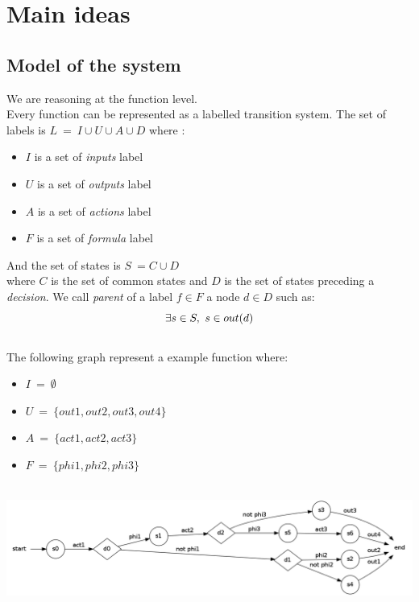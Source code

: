 \documentclass[a4paper]{report}
\begin{document}
\chapter*{Main ideas}

\section*{Model of the system}

We are reasoning at the function level.\\
Every function can be represented as a labelled transition system. The set of labels is $L\ =\ I \cup U \cup A \cup D$ where :\\
\begin{itemize}
\item $I$ is a set of \textit{inputs} label
\item $U$ is a set of \textit{outputs} label
\item $A$ is a set of \textit{actions} label
\item $F$ is a set of \textit{formula} label
\end{itemize}
And the set of states is $S\ = C \cup D$\\
where $C$ is the set of common states and $D$ is the set of states preceding a \textit{decision}.
We call \textit{parent} of a label $f \in F$ a node $d \in D$ such as:\\
\[
\exists s \in S,\ s \in out(d)\\
\]
$ $\\
\newline
The following graph represent a example function where:
\begin{itemize}
\item $I\ =\ \emptyset$
\item $U\ =\ \{out1, out2, out3, out4\}$
\item $A\ =\ \{act1, act2, act3\}$
\item $F\ =\ \{phi1, phi2, phi3\}$
\end{itemize}
$ $\\
\includegraphics[scale=0.3]{../graphviz/LTSExample.png}
$ $\\
\newline
\end{document}
